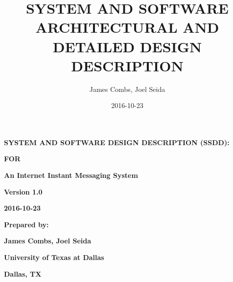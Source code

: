 \documentclass[twoside,letterpaper]{article}
\title{SYSTEM AND SOFTWARE ARCHITECTURAL AND DETAILED DESIGN DESCRIPTION}
\author{James Combs, Joel Seida}
\date{2016-10-23}
\begin{document}
\clearpage\pagestyle{Convertvi}
\thispagestyle{Convertvi}

\bigskip

\clearpage

{\centering{}\bfseries\color{black}
SYSTEM AND SOFTWARE DESIGN DESCRIPTION (SSDD):
\par}

{\centering{}\bfseries\color{black}
FOR
\par}


\bigskip

{\centering{}\bfseries\color{black}
An Internet Instant Messaging System
\par}


\bigskip


\bigskip


\bigskip

{\centering \par}

\bigskip


\bigskip


\bigskip


\bigskip

{\centering{}\bfseries\color{black}
Version 1.0
\par}

{\centering{}\bfseries\color{black}
2016-10-23
\par}

\bigskip


\bigskip

{\centering{}\bfseries\color{black}
Prepared by:
\par}

{\centering{}\bfseries\color{black}
James Combs, Joel Seida
\par}

{\centering{}\bfseries\color{black}
University of Texas at Dallas
\par}

{\centering{}\bfseries\color{black}
Dallas, TX
\par}


\end{document}
